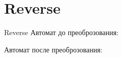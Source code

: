 \section{Reverse}
\begin{frame}{Reverse}
	Автомат до преоброзования:


	Автомат после преоброзования:


\end{frame}
